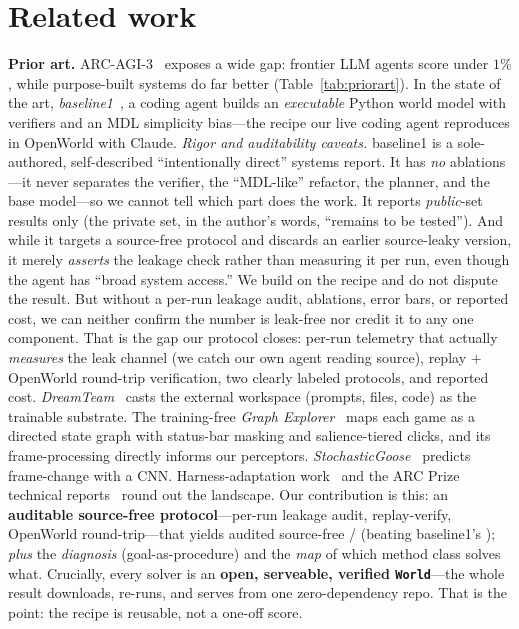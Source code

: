 \documentclass[11pt]{article}
\begin{document}
\section{Related work}
\label{sec:related}
\textbf{Prior art.} ARC-AGI-3~\cite{arcagi3_report} exposes a wide gap: frontier LLM agents score
under $1\%$, while purpose-built systems do far better (Table~\ref{tab:priorart}). In the state of the
art, \emph{baseline1}~\cite{baseline1_ewm}, a coding agent builds an \emph{executable} Python
world model with verifiers and an MDL simplicity bias---the recipe our live coding agent reproduces in
OpenWorld with Claude. \emph{Rigor and auditability caveats.} baseline1 is a sole-authored, self-described ``intentionally
direct'' systems report. It has \emph{no} ablations---it never separates the verifier, the ``MDL-like''
refactor, the planner, and the base model---so we cannot tell which part does the work. It reports
\emph{public}-set results only (the private set, in the author's words, ``remains to be tested''). And
while it targets a source-free protocol and discards an earlier source-leaky version, it merely
\emph{asserts} the leakage check rather than measuring it per run, even though the agent has ``broad system
access.'' We build on the recipe and do not dispute the result. But without a per-run leakage audit,
ablations, error bars, or reported cost, we can neither confirm the number is leak-free nor credit it to any
one component. That is the gap our protocol closes: per-run telemetry that actually \emph{measures} the leak
channel (we catch our own agent reading source), replay $+$ OpenWorld round-trip verification, two clearly
labeled protocols, and reported cost.
\emph{DreamTeam}~\cite{dreamteam_workspace} casts the external workspace
(prompts, files, code) as the trainable substrate. The training-free \emph{Graph
Explorer}~\cite{graphexplore_arc3} maps each game as a directed state graph with status-bar masking and
salience-tiered clicks, and its frame-processing directly informs our perceptors.
\emph{StochasticGoose}~\cite{stochasticgoose} predicts frame-change with a CNN. Harness-adaptation
work~\cite{harness_adapt} and the ARC Prize technical reports~\cite{arcprize2025_report} round out the
landscape. Our contribution is this: an \textbf{auditable source-free protocol}---per-run leakage
audit, replay-verify, OpenWorld round-trip---that yields audited source-free \ArcSFGames/\ArcUnionGames{}
(beating baseline1's \ArcBaselineFull{}); \emph{plus} the \emph{diagnosis} (goal-as-procedure) and the
\emph{map} of which method class solves what. Crucially, every solver is an \textbf{open, serveable,
verified \texttt{World}}---the whole result downloads, re-runs, and serves from one zero-dependency
repo. That is the point: the recipe is reusable, not a one-off score.
\end{document}
